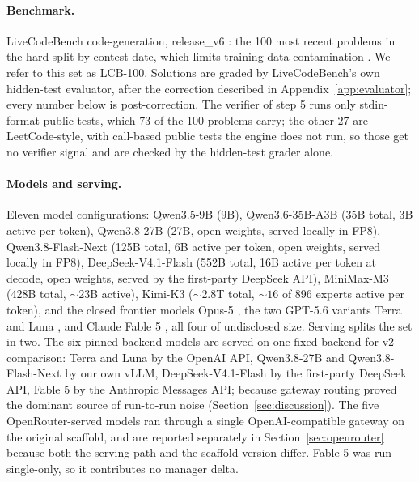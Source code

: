 \documentclass{article}
\begin{document}
\paragraph{Benchmark.} LiveCodeBench code-generation, release\_v6 \citep{jain2024}: the 100
most recent problems in the hard split by contest date, which limits training-data
contamination \citep{jain2024}. We refer to this set as LCB-100. Solutions are graded by
LiveCodeBench's own hidden-test evaluator, after the correction described in
Appendix~\ref{app:evaluator}; every number below is post-correction. The verifier of step 5
runs only stdin-format public tests, which 73 of the 100 problems carry; the other 27 are
LeetCode-style, with call-based public tests the engine does not run, so those get no verifier
signal and are checked by the hidden-test grader alone.

\paragraph{Models and serving.} Eleven model configurations: Qwen3.5-9B \citep{qwen2026a} (9B),
Qwen3.6-35B-A3B \citep{qwen2026b} (35B total, 3B active per token), Qwen3.8-27B
\citep{qwen2026c} (27B, open weights, served locally in FP8), Qwen3.8-Flash-Next
\citep{qwen2026d} (125B total, 6B active per token, open weights, served locally in FP8),
DeepSeek-V4.1-Flash \citep{deepseek2026} (552B total, 16B active per token at decode, open
weights, served by the first-party DeepSeek API), MiniMax-M3 \citep{minimax2026}
(428B total, ${\sim}23$B active), Kimi-K3 \citep{moonshot2026} (${\sim}2.8$T total,
${\sim}16$ of 896 experts active per token), and the closed frontier models Opus-5
\citep{anthropic2026}, the two GPT-5.6 variants Terra and Luna \citep{openai2026}, and Claude
Fable 5 \citep{anthropic2026}, all four of undisclosed size. Serving splits the set in two.
The six pinned-backend models are served on one fixed backend for v2 comparison: Terra and
Luna by the OpenAI API, Qwen3.8-27B and Qwen3.8-Flash-Next by our own vLLM,
DeepSeek-V4.1-Flash by the first-party DeepSeek API, Fable 5 by the
Anthropic Messages API; because gateway routing proved the dominant source of run-to-run
noise (Section~\ref{sec:discussion}). The five OpenRouter-served models ran through a
single OpenAI-compatible gateway on the original scaffold, and are reported separately in
Section~\ref{sec:openrouter} because both the serving path and the scaffold version differ.
Fable 5 was run single-only, so it contributes no manager delta.
\end{document}

